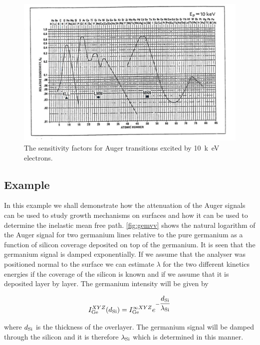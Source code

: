\begin{figure}[h!]
	\begin{center}
	\includegraphics[scale=4.5]{figures/06_13.png}
	\caption{The sensitivity factors for Auger transitions excited by \SI{10}{k\electronvolt} electrons.}
	\label{fig:aessf10kev}
	\end{center}
\end{figure} 

\subsection{Example}
In this example we shall demonstrate how the attenuation of the Auger signals can be used to study growth mechanisms on surfaces and how it can be used to determine the inelastic mean free path. \autoref{fig:gemvv} shows the natural logarithm of the Auger signal for two germanium lines relative to the pure germanium as a function of silicon coverage deposited on top of the germanium. It is seen that the germanium signal is damped exponentially. If we assume that the analyser was positioned normal to the surface we can estimate $\lambda$ for the two different kinetics energies if the coverage of the silicon is known and if we assume that it is deposited layer by layer. The germanium intensity will be given by

\begin{equation}\label{eq:gesignal}
I^{XYZ}_{\ce{Ge}}(d_{\ce{Si}})=I^{\infty XYZ}_{\ce{Ge}}e^{-\dfrac{d_{\ce{Si}}}{\lambda_{\ce{Si}}}}
\end{equation}

\noindent where $d_{\ce{Si}}$ is the thickness of the overlayer. The germanium signal will be damped through the silicon and it is therefore $\lambda_{\ce{Si}}$ which is determined in this manner.

